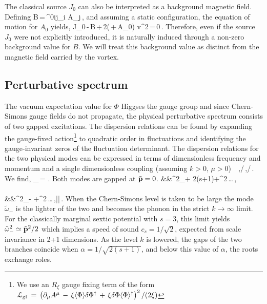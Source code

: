 The classical source $J_0$ can also be interpreted as a background magnetic field. Defining
\be
B\,=\,\epsilon^{0ij}\partial_i A_j\,,
\ee 
and assuming a static configuration, the equation of motion for $A_0$ yields,
\be
J_0\,-\,\langle B\rangle\,+\,2\left(\mu\,+\,\langle A_0\rangle\right) v^2\,=\,0\,.
\ee
Therefore, even if the source $J_0$ were not  explicitly introduced, it is naturally induced through a non-zero background value for  $B$. We will treat this background value as distinct from the magnetic field carried by the vortex.

\subsection{Perturbative spectrum} The vacuum expectation value for $\Phi$ Higgses the gauge group and since Chern-Simons gauge fields do not propagate, the physical perturbative spectrum consists of two gapped excitations.  The dispersion relations can be found by expanding the gauge-fixed  action\footnote{We use an $R_\xi$ gauge fixing term of the form ${\cal L}_{\rm gf}\,=\,\left(\partial_\mu A^{\mu}\,-\,\xi \langle\Phi\rangle\delta\Phi^\dagger\,+\,\xi\delta\Phi\langle\Phi\rangle^\dagger\right)^2/(2\xi)$} to  quadratic order in fluctuations and identifying the gauge-invariant zeros of the fluctuation determinant. The dispersion relations for the two physical modes can be expressed in terms of dimensionless frequency and  momentum  and a single dimensionless coupling (assuming $k>0$, $\mu>0$)
\be
\alpha\equiv\, \,,\qquad \tilde \omega\equiv\omega/\mu\,,\qquad {}/\mu\,.\label{alpha}
\ee
We find,
\be
\tilde\omega_{\pm}\,=\,\,.
\ee
Both modes are gapped at $\tilde{\bf p}=0$. 
\bea
&&\tilde\omega^2_+\,\simeq\,2(s+1)+^2\,\ldots\,, \\\nonumber \\\nonumber
&&\tilde\omega^2_-\,\simeq\,+^2\,\ldots\,,\qquad\qquad ||\,.
\eea
When the Chern-Simons level is taken to be large the mode $\tilde\omega_{-}$ is the lighter of the two and becomes the phonon in the strict $k\to\infty$ limit.
For the classically marginal sextic potential with $s=3$, this limit yields $\tilde\omega_-^2\simeq \tilde {\bf p}^2/2$ which implies a speed of sound $c_s=1/\sqrt 2$, expected from scale invariance in 2+1 dimensions. As the level $k$ is lowered, the gaps of the two branches coincide when $\alpha=1/\sqrt{2(s+1)}$, and below this value of $\alpha$, the roots exchange roles.
